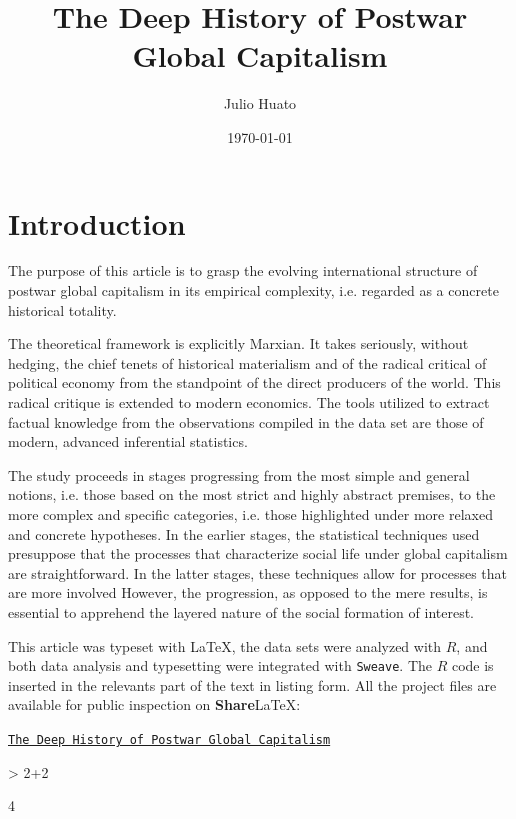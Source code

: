 \documentclass[pt=12]{article}
\title{The Deep History of Postwar Global Capitalism}
\author{Julio Huato}
\date{\today}
\begin{document}


\maketitle

\section{Introduction}


The purpose of this article is to grasp the evolving international structure of postwar global capitalism in its empirical complexity, i.e. regarded as a concrete historical totality.

The theoretical framework is explicitly Marxian.  It takes seriously, without hedging, the chief tenets of historical materialism and of the radical critical of political economy from the standpoint of the direct producers of the world.  This radical critique is extended to modern economics.  The tools utilized to extract factual knowledge from the observations compiled in the data set are those of modern, advanced inferential statistics.

The study proceeds in stages progressing from the most simple and general notions, i.e. those based on the most strict and highly abstract premises, to the more complex and specific categories, i.e. those highlighted under more relaxed and concrete hypotheses.  In the earlier stages, the statistical techniques used presuppose that the processes that characterize social life under global capitalism are straightforward.  In the latter stages, these techniques allow for processes that are more involved  However, the progression, as opposed to the mere results, is essential to apprehend the layered nature of the social formation of interest.

This article was typeset with \LaTeX, the data sets were analyzed with $R$, and both data analysis and typesetting were integrated with \texttt{Sweave}.  The $R$ code is inserted in the relevants part of the text in listing form. All the project files are available for public inspection on \textbf{Share}\LaTeX:

\href{https://www.sharelatex.com/project/5724dd4cc9e6d5e323d97763}{\texttt{The Deep History of Postwar Global Capitalism}}


\begin{Schunk}
\begin{Sinput}
> 2+2
\end{Sinput}
\begin{Soutput}
[1] 4
\end{Soutput}
\end{Schunk}
\end{document}
